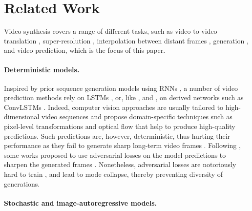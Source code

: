 \documentclass{article}
\begin{document}
\section{Related Work}
\label{sec:RelatedWork}

Video synthesis covers a range of different tasks, such as video-to-video translation \citep{Wang2018}, super-resolution \citep{Caballero2017}, interpolation between distant frames \citep{Jiang2018}, generation \citep{Tulyakov2018}, and video prediction, which is the focus of this paper.

\paragraph{Deterministic models.}

Inspired by prior sequence generation models using RNNs \citep{Graves2013}, a number of video prediction methods \citep{Srivastava2015, Villegas2017, Steenkiste2018, Wichers2018, Jin2020} rely on LSTMs \citep[Long Short-Term Memory networks,][]{Hochreiter1997}, or, like \citet{Ranzato2014}, \citet{Jia2016} and \citet{Xu2018a}, on derived networks such as ConvLSTMs \citep{Shi2015}.
Indeed, computer vision approaches are usually tailored to high-dimensional video sequences and propose domain-specific techniques such as pixel-level transformations and optical flow \citep{Shi2015, Walker2015, Finn2016, Jia2016, Walker2016, Vondrick2017, Liang2017, Liu2017, Lotter2017, Lu2017a, Fan2019, Gao2019} that help to produce high-quality predictions.
Such predictions are, however, deterministic, thus hurting their performance as they fail to generate sharp long-term video frames \citep{Babaeizadeh2018, Denton2018}.
Following \citet{Mathieu2016}, some works proposed to use adversarial losses \citep{Goodfellow2014} on the model predictions to sharpen the generated frames \citep{Vondrick2017, Liang2017, Lu2017a, Xu2018b, Wu2020}.
Nonetheless, adversarial losses are notoriously hard to train \citep{Goodfellow2016}, and lead to mode collapse, thereby preventing diversity of generations.

\paragraph{Stochastic and image-autoregressive models.}
\end{document}
